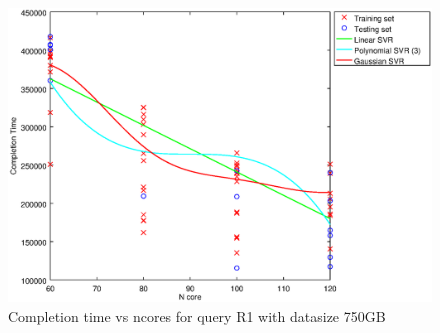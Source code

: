 
\begin {figure}[hbtp]
\centering
\includegraphics[width=\textwidth]{output/R1_750_ONLY_1_LINEAR_NCORE/plot_R1_750_bestmodels.eps}
\caption{Completion time vs ncores for query R1 with datasize 750GB}
\label{fig:only_1_linear_R1_750}
\end {figure}
